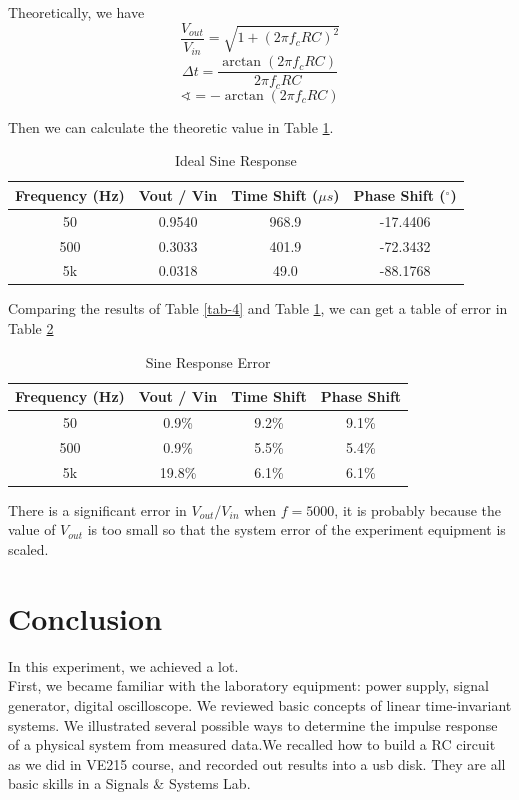 \documentclass{article}
\begin{document}
Theoretically, we have
$$\frac{V_{out}}{V_{in}}=\sqrt{1+(2\pi f_cRC)^2}$$
$$\Delta t=\frac{\arctan(2\pi f_cRC)}{2\pi f_cRC}$$
$$\sphericalangle=-\arctan(2\pi f_cRC)$$

Then we can calculate the theoretic value in Table \ref{tab-4-ideal}.

\begin{table}[htbp]
	\centering
	\begin{tabular}{|c|c|c|c|}
		\hline
		Frequency (Hz) & Vout / Vin & Time Shift ($\mu s$) & Phase Shift ($^\circ$) \\
		\hline
		50 & 0.9540 & 968.9 & -17.4406 \\
		\hline
		500 & 0.3033 & 401.9 & -72.3432 \\
		\hline
		5k & 0.0318& 49.0 & -88.1768\\
		\hline
	\end{tabular}
	\caption{Ideal Sine Response}
	\label{tab-4-ideal}
\end{table}

Comparing the results of Table \ref{tab-4} and Table \ref{tab-4-ideal}, we can get a table of error in Table \ref{tab-4-error}

\begin{table}[htbp]
	\centering
	\begin{tabular}{|c|c|c|c|}
		\hline
		Frequency (Hz) & Vout / Vin & Time Shift & Phase Shift  \\
		\hline
		50 & 0.9\% & 9.2\% & 9.1\% \\
		\hline
		500 & 0.9\% & 5.5\% & 5.4\% \\
		\hline
		5k & 19.8\% & 6.1\% & 6.1\% \\
		\hline
	\end{tabular}
	\caption{Sine Response Error}
	\label{tab-4-error}
\end{table}

There is a significant error in $V_{out} / V_{in}$ when $f=5000$, it is probably because the value of $V_{out}$ is too small so that the system error of the experiment equipment is scaled.

\section{Conclusion}

In this experiment, we achieved a lot.\\

First, we became familiar with the laboratory equipment: power supply, signal generator, digital oscilloscope. We reviewed basic concepts of linear time-invariant systems. We illustrated several possible ways to determine the impulse response of a physical system from measured data.We recalled how to build a RC circuit as we did in VE215 course, and recorded out results into a usb disk. They are all basic skills in a Signals \& Systems Lab.\\
\end{document}
